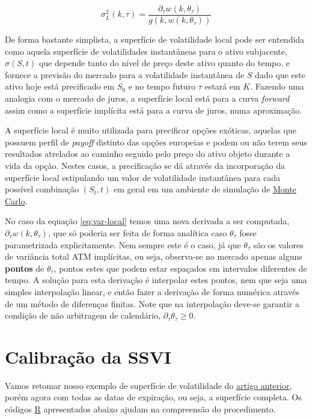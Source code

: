 \documentclass[]{book}
\theoremstyle{definition}
\theoremstyle{definition}
\theoremstyle{definition}
\theoremstyle{remark}
\begin{document}
\begin{equation}
\sigma^2_L(k, \tau)=\frac{\partial_\tau w(k, \theta_\tau)}{g(k, w(k, \theta_\tau))}
\label{eq:var-local}
\end{equation}

De forma bastante simplista, a superfície de volatilidade local pode ser
entendida como aquela superfície de volatilidades instantâneas para o
ativo subjacente, \(\sigma(S, t)\) que depende tanto do nível de preço
deste ativo quanto do tempo, e fornece a previsão do mercado para a
volatilidade instantânea de \(S\) dado que este ativo hoje está
precificado em \(S_0\) e no tempo futuro \(\tau\) estará em \(K\).
Fazendo uma analogia com o mercado de juros, a superfície local está
para a curva \emph{forward} assim como a superfície implícita está para
a curva de juros, numa aproximação.

A superfície local é muito utilizada para precificar opções exóticas,
aquelas que possuem perfil de \emph{payoff} distinto das opções
europeias e podem ou não terem seus resultados atrelados ao caminho
seguido pelo preço do ativo objeto durante a vida da opção. Nestes
casos, a precificação se dá através da incorporação da superfície local
estipulando um valor de volatilidade instantânea para cada possível
combinação \((S_t, t)\) em geral em um ambiente de simulação de
\protect\hyperlink{monte-carlo}{Monte Carlo}.

No caso da equação \eqref{eq:var-local} temos uma nova derivada a ser
computada, \(\partial_\tau w(k, \theta_\tau)\), que só poderia ser feita
de forma analítica caso \(\theta_\tau\) fosse parametrizada
explicitamente. Nem sempre este é o caso, já que \(\theta_\tau\) são os
valores de variância total ATM implícitas, ou seja, observa-se no
mercado apenas alguns \textbf{pontos} de \(\theta_\tau\), pontos estes
que podem estar espaçados em intervalos diferentes de tempo. A solução
para esta derivação é interpolar estes pontos, nem que seja uma simples
interpolação linear, e então fazer a derivação de forma numérica através
de um método de diferenças finitas. Note que na interpolação deve-se
garantir a condição de não arbitragem de calendário,
\(\partial_\tau\theta_\tau\geq 0\).

\section{Calibração da SSVI}\label{calibracao-da-ssvi}

Vamos retomar nosso exemplo de superfície de volatilidade do
\protect\hyperlink{svi}{artigo anterior}, porém agora com todas as datas
de expiração, ou seja, a superfície completa. Os códigos
\href{https://cran.r-project.org/}{R} apresentados abaixo ajudam na
compreensão do procedimento.
\end{document}
